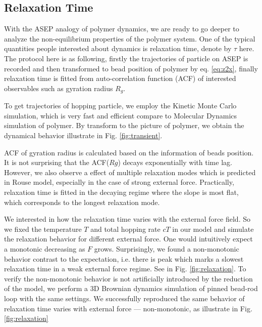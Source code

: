 \documentclass[aps,showpacs,twocolumn,floatfix,prx,superscriptaddress]{revtex4-1}
\begin{document}
\subsection{Relaxation Time}
With the ASEP analogy of polymer dynamics, we are ready to go deeper to analyze
the non-equilibrium properties of the polymer system. One of the typical
quantities people interested about dynamics is relaxation time, denote by
$\tau$ here. The protocol here is as following, firstly the trajectories of
particle on ASEP is recorded and then transformed to bead position of polymer
by eq.  \eqref{eq:z2x}, finally relaxation time is fitted from auto-correlation
function (ACF) of interested observables such as gyration radius $R_g$.

To get trajectories of hopping particle, we employ the Kinetic Monte Carlo
simulation\cite{}, which is very fast and efficient compare to Molecular Dynamics
simulation of polymer. By transform to the picture of polymer, we obtain the
dynamical behavior illustrate in Fig. \ref{fig:transient}. 

ACF of gyration radius is calculated based on the information of beads position.
It is not surprising that the ACF($Rg$) decays exponentially with time
lag. However, we also observe a effect of multiple relaxation modes which is
predicted in Rouse model, especially in the case of strong external force.
Practically, relaxation time is fitted in the decaying regime where the slope
is most flat, which corresponds to the longest relaxation mode.   

We interested in how the relaxation time varies with the external force field.
So we fixed the temperature $T$ and total hopping rate $cT$ in our model and
simulate the relaxation behavior for different external force. One would
intuitively expect a monotonic decreasing as $F$ grows. Surprisingly, we found a
non-monotonic behavior contrast to the expectation, i.e. there is peak which
marks a slowest relaxation time in a weak external force regime. See in Fig.
\ref{fig:relaxation}. To verify the non-monotonic behavior is not artificially
introduced by the reduction of the model, we perform a 3D Brownian dynamics
simulation of pinned bead-rod loop with the same settings. We successfully
reproduced the same behavior of relaxation time varies with external force ---
non-monotonic, as illustrate in Fig. \ref{fig:relaxation}
\end{document}
